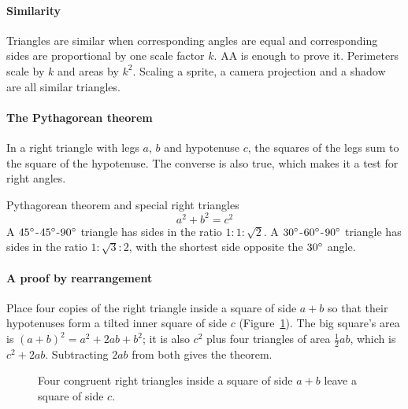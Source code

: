 \paragraph{Similarity} Triangles are similar when corresponding angles are equal and corresponding sides are proportional by one scale factor $k$. AA is enough to prove it. Perimeters scale by $k$ and areas by $k^2$. Scaling a sprite, a camera projection and a shadow are all similar triangles.

\paragraph{The Pythagorean theorem} In a right triangle with legs $a$, $b$ and hypotenuse $c$, the squares of the legs sum to the square of the hypotenuse. The converse is also true, which makes it a test for right angles.

\begin{keybox}{Pythagorean theorem and special right triangles}
\[
a^2 + b^2 = c^2
\]
A $45^\circ$-$45^\circ$-$90^\circ$ triangle has sides in the ratio $1 : 1 : \sqrt{2}$. A $30^\circ$-$60^\circ$-$90^\circ$ triangle has sides in the ratio $1 : \sqrt{3} : 2$, with the shortest side opposite the $30^\circ$ angle.
\end{keybox}

\paragraph{A proof by rearrangement} Place four copies of the right triangle inside a square of side $a + b$ so that their hypotenuses form a tilted inner square of side $c$ (Figure~\ref{fig:pythag}). The big square's area is $(a + b)^2 = a^2 + 2ab + b^2$; it is also $c^2$ plus four triangles of area $\tfrac{1}{2}ab$, which is $c^2 + 2ab$. Subtracting $2ab$ from both gives the theorem.

\begin{figure}[H]
\centering
{}
\caption{Four congruent right triangles inside a square of side $a + b$ leave a square of side $c$.}
\label{fig:pythag}
\end{figure}

